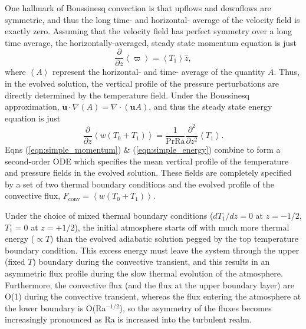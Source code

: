 \documentclass[aps, pre, onecolumn, nofootinbib, notitlepage, groupedaddress, amsfonts, amssymb, amsmath, longbibliography]{revtex4-1}
\newcommand{\Div}[1]{\ensuremath{\nabla\cdot\left( #1\right)}}
\newcommand{\angles}[1]{\ensuremath{\left\langle #1 \right\rangle}}
\newcommand{\grad}{\ensuremath{\nabla}}
\begin{document}
One hallmark of Boussinesq convection is that upflows and downflows are symmetric, and thus the long time- and horizontal-
average of the velocity field is exactly zero.  Assuming that the velocity field has perfect symmetry over a long time
average, the horizontally-averaged, steady state momentum equation is just
\begin{equation}
\frac{\partial}{\partial z}\angles{\varpi} = \angles{T_1}\hat{z},
	\label{eqn:simple_momentum}
\end{equation}
where $\angles{A}$ represent the horizontal- and time- average of the quantity $A$.  Thus, in the evolved solution, the
vertical profile of the pressure perturbations are directly determined by the temperature field. 
Under the Boussinesq approximation, $\bm{u}\cdot\grad(A) = \Div{\bm{u}A}$, and thus the steady state energy equation
is just
\begin{equation}
\frac{\partial}{\partial z}\angles{w(T_0 + T_1)} = \frac{1}{\text{Pr}\text{Ra}}\frac{\partial^2}{\partial z^2} \angles{T_1}.
	\label{eqn:simple_energy}
\end{equation}
Eqns (\ref{eqn:simple_momentum}) \& (\ref{eqn:simple_energy}) combine to form a second-order ODE which specifies the
mean vertical profile of the temperature and pressure fields in the evolved solution.  These fields are completely specified
by a set of two thermal boundary conditions and the evolved 
profile of the convective flux, $F_{\text{conv}} = \angles{w(T_0 + T_1)}$.

Under the choice of mixed thermal boundary conditions ($dT_1/dz = 0$ at $z = -1/2$, $T_1 = 0$ at $z = +1/2$), the initial
atmosphere starts off with much more thermal energy ($\propto T$) than the evolved adiabatic solution pegged by the
top temperature boundary condition.  This excess energy must leave the system through the upper (fixed $T$) boundary
during the convective transient, and this results in an asymmetric flux profile during the slow thermal evolution of the
atmosphere.  Furthermore, the convective flux (and the flux at the upper boundary layer) are O(1) during the convective
transient, whereas the flux entering the atmosphere at the lower boundary is O(Ra$^{-1/2}$), so the asymmetry of the fluxes
becomes increasingly pronounced as Ra is increased into the turbulent realm. 
\end{document}

